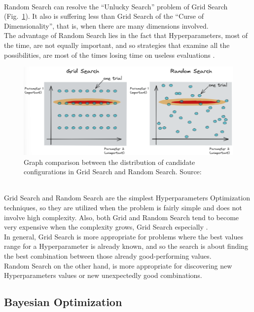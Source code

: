 \\[0.3cm]Random Search can resolve the “Unlucky Search” problem of Grid Search (Fig.~\ref{fig:figure-2.2.5}).
It also is suffering less than Grid Search of the “Curse of Dimensionality”, that is, when there are many dimensions involved.
\\[0.3cm]The advantage of Random Search lies in the fact that Hyperparameters, most of the time, are not equally important, and so strategies that examine all the possibilities, are most of the times losing time on useless evaluations \cite{Tesi-1.2}.
\begin{figure}[t]
	\centering
	\includegraphics[width=15cm]{figures/figure-2.2.5.png}
	\caption[Grid Search and Random Search Comparison]{Graph comparison between the distribution of candidate configurations in Grid Search and Random Search. Source:~\cite{Tesi-1.3}}
	\label{fig:figure-2.2.5}
\end{figure}
% 
\\[0.3cm]Grid Search and Random Search are the simplest Hyperparameters Optimization techniques, so they are utilized when the problem is fairly simple and does not involve high complexity.
Also, both Grid and Random Search tend to become very expensive when the complexity grows, Grid Search especially \cite{Tesi-1.4}.
\\[0.3cm]In general, Grid Search is more appropriate for problems where the best values range for a Hyperparameter is already known, and so the search is about finding the best combination between those already good-performing values.
\\[0.3cm]Random Search on the other hand, is more appropriate for discovering new Hyperparameters values or new unexpectedly good combinations.

\subsection{Bayesian Optimization}

